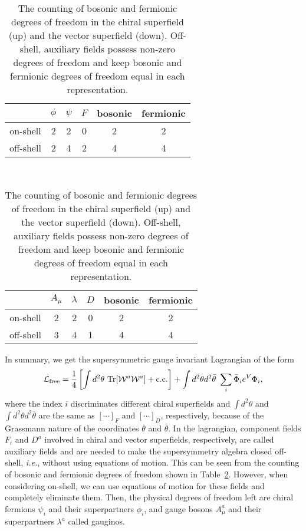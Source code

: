 \documentclass[12pt,twoside,book]{article}
\begin{document}
\begin{table}[t]
  \centering
  \begin{tabular}{c|ccc|cc}
    & $\phi$ & $\psi$ & $F$ & bosonic & fermionic \\ \hline
    on-shell & 2 & 2 & 0 & 2 & 2 \\
    off-shell & 2 & 4 & 2 & 4 & 4 \\
  \end{tabular} \\ \vspace{5mm}
  \begin{tabular}{c|ccc|cc}
    & $A_\mu$ & $\lambda$ & $D$ & bosonic & fermionic \\ \hline
    on-shell & 2 & 2 & 0 & 2 & 2 \\
    off-shell & 3 & 4 & 1 & 4 & 4 \\
  \end{tabular}
  \caption{
    The counting of bosonic and fermionic degrees of freedom in the chiral superfield (up) and the vector superfield (down).
    Off-shell, auxiliary fields possess non-zero degrees of freedom and keep bosonic and fermionic degrees of freedom equal in each representation.
  }
  \label{tab:counting}
\end{table}

In summary, we get the supersymmetric gauge invariant Lagrangian of the form
\begin{align}
 \mathcal{L}_{\rm free} = \frac{1}{4} \left[ \int d^2 \theta\ {\rm Tr}
 [\mathcal{W}^a \mathcal{W}^a] + {\rm c.c.} \right] + \int d^2 \theta
 d^2 \bar{\theta}\ \sum_{i} \bar{\Phi}_i e^V
 \Phi_i,\label{freelagrangian}
\end{align}
where the index $i$ discriminates different chiral superfields and $\int d^2 \theta$ and $\int d^2 \theta d^2 \bar{\theta}$ are the same as $[\cdots ]_F$ and $[\cdots ]_D$, respectively, because of the Grassmann nature of the coordinates $\theta$ and $\bar{\theta}$.
In the lagrangian, component fields $F_i$ and $D^a$ involved in chiral and vector superfields, respectively, are called auxiliary fields and are needed to make the supersymmetry algebra closed off-shell, \textit{i.e.}, without using equations of motion.
This can be seen from the counting of bosonic and fermionic degrees of freedom shown in Table~\ref{tab:counting}.
However, when considering on-shell, we can use equations of motion for these fields and completely eliminate them.
Then, the physical degrees of freedom left are chiral fermions $\psi_i$ and their superpartners $\phi_i$, and gauge bosons $A_\mu^a$ and their superpartners $\lambda^a$ called gauginos.
\end{document}
